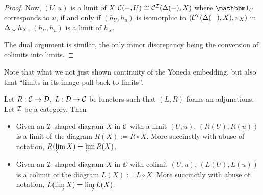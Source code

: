 \begin{proof}
  Now, $(U,u)$ is a limit of $X$  
  $\mathcal{C}(-,U) \cong_{} \mathcal{C}^{\mathcal{I}}(\Delta(-),X)$ where $\id{U}$ corresponds to $u$,
  if and only if $(h_U,h_u)$ is isomorphic to $(\mathcal{C}^{\mathcal{I}}(\Delta(-),X),\pi_X)$
  in $\Delta\downarrow h_X$,
   $(h_U,h_u)$ is a limit of $h_X$.

  The dual argument is similar, the only minor discrepancy being 
  the conversion of colimits into limits.
\end{proof}

\begin{rmk}
  Note that what we not just shown continuity of the Yoneda embedding,
  but also that ``limits in its image pull back to limits''.
\end{rmk}

\begin{prop}
  
  Let $R : \mathcal{C} \to \mathcal{D}$, $L : \mathcal{D} \to \mathcal{C}$ be functors such that 
  $(L,R)$ forms an adjunctions. 
  Let $\mathcal{I}$ be a category.
  Then 
  \begin{itemize}
    \item Given an $\mathcal{I}$-shaped diagram $X$ in $\mathcal{C}$ with a limit $(U,u)$,
    $(R(U),R(u))$ is a limit of the diagram $R(X) := R \circ X$.
    More succinctly with abuse of notation, $R(\varprojlim X) = \varprojlim R(X)$.
    \item Given an $\mathcal{I}$-shaped diagram $X$ in $\DD$ with colimit $(U,u)$, 
    $(L(U),L(u))$ is a colimit of the diagram $L(X) := L \circ X$.
    More succinctly with abuse of notation, $L(\varinjlim X) = \varinjlim L(X)$.
  \end{itemize} 
\end{prop}
